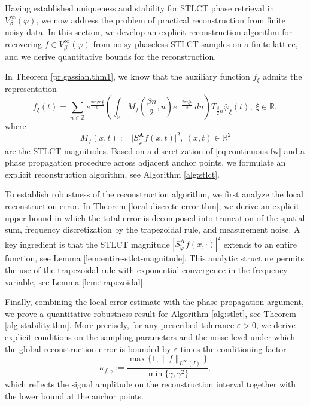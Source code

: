 \documentclass[11pt, reqno]{amsart}
\newcommand{\Z}{\mathbb{Z}}
\newcommand{\R}{\mathbb{R}}
\numberwithin{equation}{section}
\begin{document}
\medskip 

Having established uniqueness and stability for STLCT phase retrieval in $V_\beta^\infty(\varphi)$, we now address the problem of practical reconstruction from finite noisy data. In this section, we develop an explicit reconstruction algorithm for recovering $f\in V_\beta^\infty(\varphi)$ from noisy phaseless STLCT samples on a finite lattice,  and we derive quantitative bounds for the reconstruction.

In Theorem \ref{pr.gassian.thm1}, we know that the auxiliary function $f_\xi$ admits the representation
\begin{equation}\label{eq:continuous-fw}
f_\xi(t) = \sum_{n\in\Z} e^{\frac{\pi ia\beta n\xi}{b}}
\left( \int_{\R} M_f\!\left(\frac{\beta n}{2},u\right)e^{-\frac{2\pi i\xi u}{b}}\,du
\right) T_{\frac{\beta}{2}n}\widetilde{\varphi_\xi}(t), \  \xi\in\R,
\end{equation} 
where 
 \begin{equation}\label{modulous.def.Mf}
M_f(x,t):=\bigl|S_{\check{\varphi}}^{\mathbf A}f(x,t)\bigr|^2,  \ (x,t)\in\R^2
\end{equation}  
are the  STLCT magnitudes.  Based on a discretization of \eqref{eq:continuous-fw} and a phase propagation procedure across adjacent anchor points, we formulate an explicit reconstruction algorithm, see Algorithm \ref{alg:stlct}.

To establish robustness of the reconstruction algorithm, we first analyze the local reconstruction error. In Theorem \ref{local-discrete-error.thm}, we derive an explicit upper bound in which the total error is decomposed into truncation of the spatial sum, frequency discretization by the trapezoidal rule, and measurement noise.   A key ingredient is that the STLCT magnitude $|S_{\check{\varphi}}^{\mathbf A}f(x,\cdot)|^2$ extends to an entire function, see Lemma \ref{lem:entire-stlct-magnitude}. This analytic structure permits the use of the trapezoidal rule with exponential convergence in the frequency variable, see Lemma \ref{lem:trapezoidal}.



Finally, combining the local error estimate with the phase propagation argument, we prove a quantitative robustness result for Algorithm \ref{alg:stlct}, see Theorem \ref{alg-stability.thm}. More precisely, for any prescribed tolerance $\varepsilon>0$, we derive explicit conditions on the sampling parameters and the noise level under which the global reconstruction error is bounded by $\varepsilon$ times the conditioning factor
\[ \kappa_{f,\gamma} := \frac{\max\{1,\|f\|_{L^\infty(I)}\}}{\min\{\gamma,\gamma^2\}},\]
which reflects the signal amplitude on the reconstruction interval together with the lower bound at the anchor points.
\end{document}
